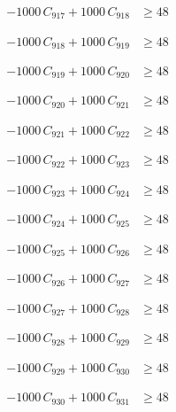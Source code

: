 \documentclass[a4paper,11pt]{article}
\begin{document}
\begin{align}
-1000\,C_{917} + 1000\,C_{918} &\geq 48 \nonumber
\end{align}

\begin{align}
-1000\,C_{918} + 1000\,C_{919} &\geq 48 \nonumber
\end{align}

\begin{align}
-1000\,C_{919} + 1000\,C_{920} &\geq 48 \nonumber
\end{align}

\begin{align}
-1000\,C_{920} + 1000\,C_{921} &\geq 48 \nonumber
\end{align}

\begin{align}
-1000\,C_{921} + 1000\,C_{922} &\geq 48 \nonumber
\end{align}

\begin{align}
-1000\,C_{922} + 1000\,C_{923} &\geq 48 \nonumber
\end{align}

\begin{align}
-1000\,C_{923} + 1000\,C_{924} &\geq 48 \nonumber
\end{align}

\begin{align}
-1000\,C_{924} + 1000\,C_{925} &\geq 48 \nonumber
\end{align}

\begin{align}
-1000\,C_{925} + 1000\,C_{926} &\geq 48 \nonumber
\end{align}

\begin{align}
-1000\,C_{926} + 1000\,C_{927} &\geq 48 \nonumber
\end{align}

\begin{align}
-1000\,C_{927} + 1000\,C_{928} &\geq 48 \nonumber
\end{align}

\begin{align}
-1000\,C_{928} + 1000\,C_{929} &\geq 48 \nonumber
\end{align}

\begin{align}
-1000\,C_{929} + 1000\,C_{930} &\geq 48 \nonumber
\end{align}

\begin{align}
-1000\,C_{930} + 1000\,C_{931} &\geq 48 \nonumber
\end{align}
\end{document}
